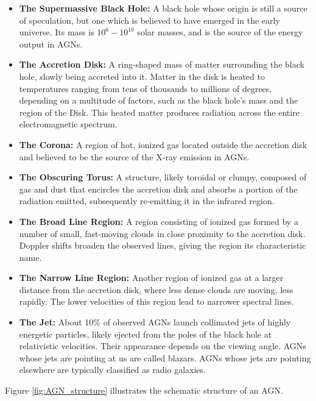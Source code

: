 \begin{itemize}
    \item \textbf{The Supermassive Black Hole:} A black hole whose origin is still a source of speculation, but one which is believed to have emerged in the early universe. Its mass is $10^6 - 10^{10}$ solar masses, and is the source of the energy output in AGNs.
    \item \textbf{The Accretion Disk:} A ring-shaped mass of matter surrounding the black hole, slowly being accreted into it. Matter in the disk is heated to temperatures ranging from tens of thousands to millions of degrees, depending on a multitude of factors, such as the black hole's mass and the region of the Disk. This heated matter produces radiation across the entire electromagnetic spectrum.
    \item \textbf{The Corona:} A region of hot, ionized gas located outside the accretion disk and believed to be the source of the X-ray emission in AGNs.
    \item \textbf{The Obscuring Torus:} A structure, likely toroidal or clumpy, composed of gas and dust that encircles the accretion disk and absorbs a portion of the radiation emitted, subsequently re-emitting it in the infrared region.
    \item \textbf{The Broad Line Region:} A region consisting of ionized gas formed by a number of small, fast-moving clouds in close proximity to the accretion disk. Doppler shifts broaden the observed lines, giving the region its characteristic name.
    \item \textbf{The Narrow Line Region:} Another region of ionized gas at a larger distance from the accretion disk, where less dense clouds are moving, less rapidly. The lower velocities of this region lead to narrower spectral lines.
    \item \textbf{The Jet:} About 10\% of observed AGNs launch collimated jets of highly energetic particles, likely ejected from the poles of the black hole at relativistic velocities. Their appearance depends on the viewing angle. AGNs whose jets are pointing at us are called blazars. AGNs whose jets are pointing elsewhere are typically classified as radio galaxies.
\end{itemize}

Figure \ref{fig:AGN_structure} illustrates the schematic structure of an AGN.

